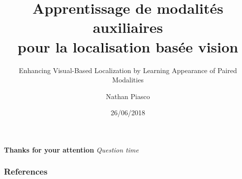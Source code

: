 \documentclass[9pt]{beamer}
\title[Multi-modal Visual Localization]{Apprentissage de modalités auxiliaires \\
pour la localisation basée vision}
\subtitle{\small{Enhancing Visual-Based Localization by Learning Appearance of Paired Modalities}}
\author{Nathan Piasco}
\institute{Congrès Reconnaissance des Formes, Image, Apprentissage et Perception 2018} %
\date{26/06/2018}
\begin{document}
\begin{frame}[plain,c]
	\titlepage
\end{frame}

\begin{frame}[plain,c]
	\tableofcontents
\end{frame}







\begin{frame}[plain,c]
\centering
\vfill
\textbf{\huge{Thanks for your attention}}
\vfill
\huge{\textit{Question time}}
\vfill
\end{frame}

\begin{frame}
\frametitle{References}


\scriptsize{}

\end{frame}
\end{document}
